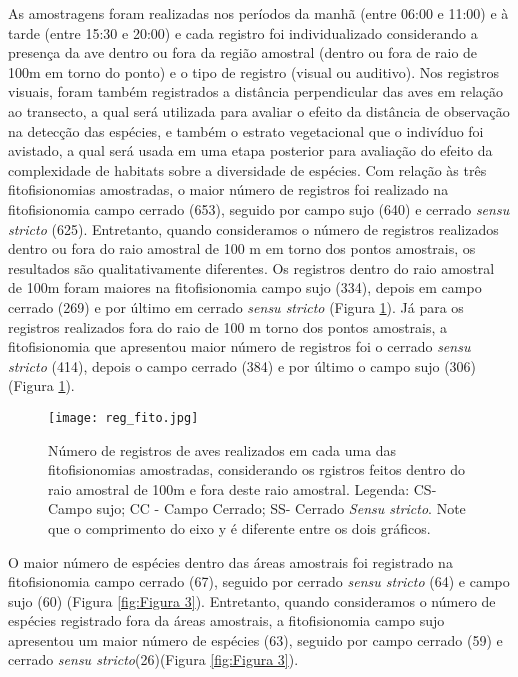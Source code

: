As amostragens foram realizadas nos períodos da manhã (entre 06:00 e 11:00) e à tarde (entre 15:30 e 20:00) e cada registro foi  individualizado considerando a presença da ave dentro ou fora da região amostral (dentro ou fora de raio de 100m em torno do ponto) e o tipo de registro (visual ou auditivo). Nos registros visuais, foram também registrados a distância perpendicular das aves em relação ao transecto, a qual será utilizada para avaliar o efeito da distância de observação na detecção das espécies, e também o estrato vegetacional que o indivíduo foi avistado, a qual será usada em uma etapa posterior para avaliação do efeito da complexidade de habitats sobre a diversidade de espécies.
Com relação às três fitofisionomias amostradas, o maior número de registros foi realizado na fitofisionomia campo cerrado (653), seguido por campo sujo (640) e cerrado \textit{sensu stricto} (625). Entretanto, quando consideramos o número de registros realizados dentro ou fora do raio amostral de 100 m em torno dos pontos amostrais, os resultados são qualitativamente diferentes.
Os registros dentro do raio amostral de 100m foram maiores na fitofisionomia campo sujo (334), depois em campo cerrado (269) e por último em cerrado \textit{sensu stricto} (Figura \ref{fig:Figura 2}). Já para os registros realizados fora do raio de 100 m torno dos pontos amostrais, a fitofisionomia que apresentou maior número de registros foi o cerrado \textit{sensu stricto} (414), depois o campo cerrado (384) e por último o campo sujo (306) (Figura \ref{fig:Figura 2}).

\begin{figure}[hbtp]
\centering
\texttt{[image: reg\_fito.jpg]}
\caption{Número de registros de aves realizados em cada uma das fitofisionomias amostradas, considerando os rgistros feitos dentro do raio amostral de 100m e fora deste raio amostral. Legenda: CS- Campo sujo; CC -  Campo Cerrado; SS- Cerrado \textit{Sensu stricto}. Note que o comprimento do eixo y é diferente entre os dois gráficos.}

\label{fig:Figura 2} 
\end{figure}


O maior número de espécies dentro das áreas amostrais foi registrado na fitofisionomia campo cerrado (67), seguido por cerrado \textit{sensu stricto} (64) e campo sujo (60) (Figura \ref{fig:Figura 3}). Entretanto, quando consideramos o número de espécies registrado fora da áreas amostrais, a fitofisionomia campo sujo apresentou um maior número de espécies (63), seguido por campo cerrado (59) e cerrado \textit{sensu stricto}(26)(Figura \ref{fig:Figura 3}).


